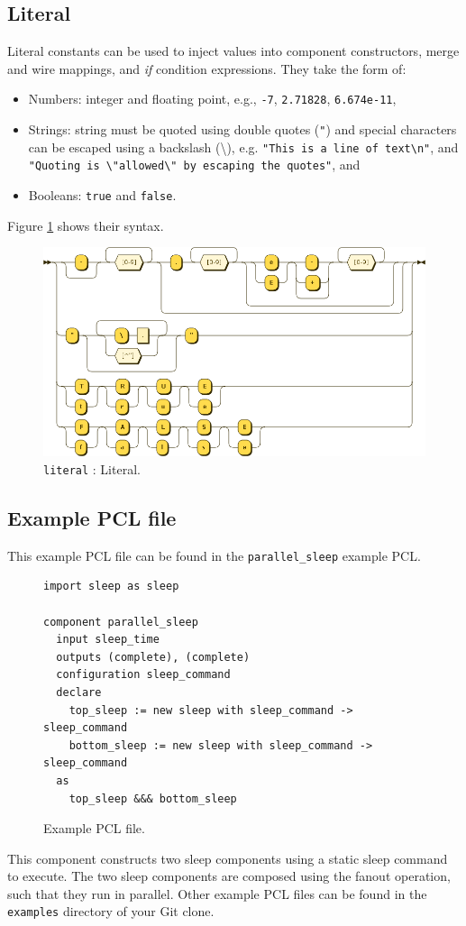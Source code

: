\subsection{Literal}\label{sec:literals}
Literal constants can be used to inject values into component constructors, merge and wire mappings, and \emph{if} condition expressions. They take the form of:
\begin{itemize}
\item Numbers: integer and floating point, e.g., \texttt{-7}, \texttt{2.71828}, \texttt{6.674e-11},
\item Strings: string must be quoted using double quotes (\texttt{"}) and special characters can be escaped using a backslash (\textbackslash), e.g. \texttt{"This is a line of text\textbackslash n"}, and \texttt{"Quoting is \textbackslash"allowed\textbackslash" by escaping the quotes"}, and
\item Booleans: \texttt{true} and \texttt{false}.
\end{itemize}
Figure \ref{fig:pcl-literal} shows their syntax.
\begin{figure}[h!]
  \centering
    \includegraphics[scale=\DiagramScale,angle=90]{chapters/compiler/diagrams/literal}
  \caption{\texttt{literal} : Literal.}
  \label{fig:pcl-literal}
\end{figure}

\subsection{Example PCL file}
This example PCL file can be found in the \texttt{parallel\_sleep} example PCL.
\begin{figure}[h!]
  \begin{verbatim}
import sleep as sleep

component parallel_sleep
  input sleep_time
  outputs (complete), (complete)
  configuration sleep_command
  declare
    top_sleep := new sleep with sleep_command -> sleep_command
    bottom_sleep := new sleep with sleep_command -> sleep_command
  as
    top_sleep &&& bottom_sleep
  \end{verbatim}
  \caption{Example PCL file.}
\end{figure}
This component constructs two sleep components using a static sleep command to execute. The two sleep components are composed using the fanout operation, such that they run in parallel. Other example PCL files can be found in the \texttt{examples} directory of your Git clone.

